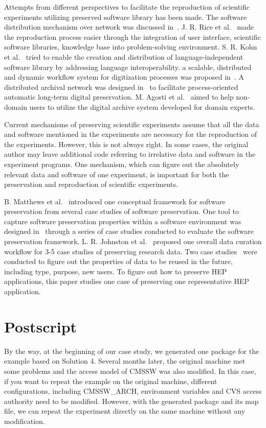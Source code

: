 \documentclass{sig-alternate}
\begin{document}
Attempts from different perspectives to facilitate the reproduction of scientific experiments utilizing preserved software library has been made. 
The software distribution mechanism over network was discussed in~\cite{compostella2010cdf, blomer2011cernvm}.
J. R. Rice et al.~\cite{rice1996scientific} made the reproduction process easier through the integration of user interface, scientific software libraries, knowledge base into problem-solving environment.
S. R. Kohn et al.~\cite{kohn2001divorcing} tried to enable the creation and distribution of language-independent software library by addressing language interoperability.
a scalable, distributed and dynamic workflow system for digitization processes was proposed in~\cite{schoneberg2013scalable}.
A distributed archival network was designed in~\cite{subotic2013distributed} to facilitate process-oriented automatic long-term digital preservation.
M. Agosti et al.~\cite{agosti2012envisage} aimed to help non-domain users to utilize the digital archive system developed for domain experts.

Current mechanisms of preserving scientific experiments assume that all the data and software mentioned in the experiments are necessary for the reproduction of the experiments. However, this is not always right. In some cases, the original author may leave additional code referring to irrelative data and software in the experiment programs. One mechanism, which can figure out the absolutely relevant data and software of one experiment, is important for both the preservation and reproduction of scientific experiments.

B. Matthews et al.~\cite{matthews2008significant} introduced one conceptual framework for software preservation from several case studies of software preservation.
One tool to capture software preservation properties within a software environment was designed in~\cite{matthews2010framework} through a series of case studies conducted to evaluate the software preservation framework.
L. R. Johnston et al.~\cite{johnston2014workflow} proposed one overall data curation workflow for 3-5 case studies of preserving research data.
Two case studies~\cite{borgman2012data} were conducted to figure out the properties of data to be reused in the future, including type, purpose, new users.
To figure out how to preserve HEP applications, this paper studies one case of preserving one representative HEP application.

\section{Postscript}
By the way, at the beginning of our case study, we generated one package for the
example based on Solution 4. Several months later, the original machine met
some problems and the access model of CMSSW was also modified. In this case, if
you want to repeat the example on the original machine, different 
configurations, including CMSSW\_ARCH, environment variables and CVS access
authority need to be modified. However, with the generated package and its map file, we can repeat the experiment directly on the same machine without any modification.



\end{document}
